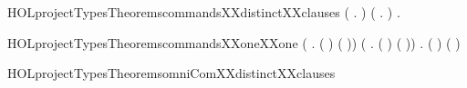 \newcommand{\HOLprojectTypesDatatypesstate}{\UseVerbatim{HOLprojectTypesDatatypesstate}}
\newcommand{\HOLprojectTypesDatatypes}{
\HOLprojectTypesDatatypescommands\HOLprojectTypesDatatypesomniCom\HOLprojectTypesDatatypesoutput\HOLprojectTypesDatatypesplatoonLeaderCom\HOLprojectTypesDatatypesplatoonSergeantCom\HOLprojectTypesDatatypesprincipal\HOLprojectTypesDatatypesstate}
\begin{SaveVerbatim}{HOLprojectTypesTheoremscommandsXXdistinctXXclauses}
\HOLTokenTurnstile{} (\HOLSymConst{\HOLTokenForall{}} .   \HOLSymConst{\HOLTokenNotEqual{}}  ) \HOLSymConst{\HOLTokenConj{}}
   (\HOLSymConst{\HOLTokenForall{}} .   \HOLSymConst{\HOLTokenNotEqual{}}  ) \HOLSymConst{\HOLTokenConj{}}
   \HOLSymConst{\HOLTokenForall{}} .   \HOLSymConst{\HOLTokenNotEqual{}}  
\end{SaveVerbatim}
\newcommand{\HOLprojectTypesTheoremscommandsXXdistinctXXclauses}{\UseVerbatim{HOLprojectTypesTheoremscommandsXXdistinctXXclauses}}
\begin{SaveVerbatim}{HOLprojectTypesTheoremscommandsXXoneXXone}
\HOLTokenTurnstile{} (\HOLSymConst{\HOLTokenForall{}} .
      (  \HOLSymConst{=}  ) \HOLSymConst{\HOLTokenEquiv{}} ( \HOLSymConst{=} )) \HOLSymConst{\HOLTokenConj{}}
   (\HOLSymConst{\HOLTokenForall{}} .
      (  \HOLSymConst{=}  ) \HOLSymConst{\HOLTokenEquiv{}}
      ( \HOLSymConst{=} )) \HOLSymConst{\HOLTokenConj{}} \HOLSymConst{\HOLTokenForall{}} . (  \HOLSymConst{=}  ) \HOLSymConst{\HOLTokenEquiv{}} ( \HOLSymConst{=} )
\end{SaveVerbatim}
\newcommand{\HOLprojectTypesTheoremscommandsXXoneXXone}{\UseVerbatim{HOLprojectTypesTheoremscommandsXXoneXXone}}
\begin{SaveVerbatim}{HOLprojectTypesTheoremsomniComXXdistinctXXclauses}
\HOLTokenTurnstile{}  \HOLSymConst{\HOLTokenNotEqual{}} 
\end{SaveVerbatim}
